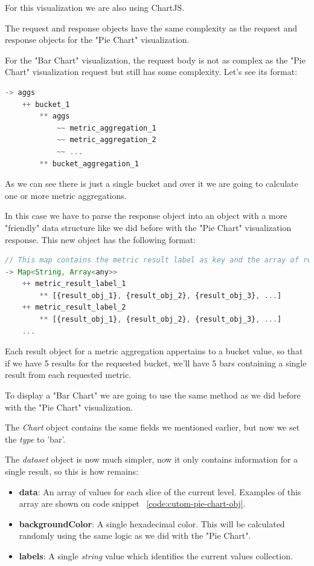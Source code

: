 \documentclass[a4paper, 12pt, english]{book}
\begin{document}
For this visualization we are also using ChartJS.

The request and response objects have the same complexity as the request and response objects for the "Pie Chart" visualization.

For the "Bar Chart" visualization, the request body is not as complex as the "Pie Chart" visualization request but still has some complexity. Let's see its format:
\begin{lstlisting}[language=javascript, caption=Bar Chart request body format, label=code:bar-chart-request]
-> aggs
    ++ bucket_1
        ** aggs
            ~~ metric_aggregation_1
            ~~ metric_aggregation_2
            ~~ ...
        ** bucket_aggregation_1
\end{lstlisting}

As we can see there is just a single bucket and over it we are going to calculate one or more metric aggregations.

In this case we have to parse the response object into an object with a more "friendly" data structure like we did before with the "Pie Chart" visualization response. This new object has the following format:
\begin{lstlisting}[language=javascript, caption=Custom results object, label=code:cutom-pie-chart-obj]
// This map contains the metric result label as key and the array of results as value.
-> Map<String, Array<any>>
    ++ metric_result_label_1
        ** [{result_obj_1}, {result_obj_2}, {result_obj_3}, ...]
    ++ metric_result_label_2
        ** [{result_obj_1}, {result_obj_2}, {result_obj_3}, ...]
    ...
\end{lstlisting}

Each result object for a metric aggregation appertains to a bucket value, so that if we have 5 results for the requested bucket, we'll have 5 bars containing a single result from each requested metric.

To display a "Bar Chart" we are going to use the same method as we did before with the "Pie Chart" visualization.

The \textit{Chart} object contains the same fields we mentioned earlier, but now we set the \textit{type} to 'bar'.

The \textit{dataset} object is now much simpler, now it only contains information for a single result, so this is how remains:
\begin{itemize}
    \item \textbf{data}: An array of values for each slice of the current level. Examples of this array are shown on code snippet ~\ref{code:cutom-pie-chart-obj}.
    \item \textbf{backgroundColor}: A single hexadecimal color. This will be calculated randomly using the same logic as we did with the "Pie Chart".
    \item \textbf{labels}: A single \textit{string} value which identifies the current values collection.
\end{itemize}
\end{document}
